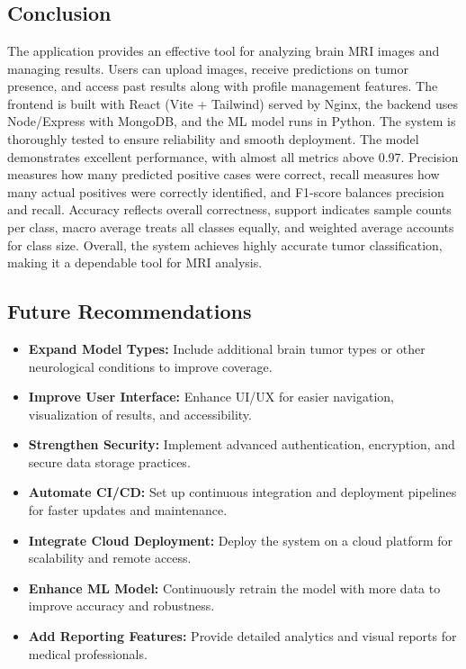 \section*{\Large{}}

\subsection{Conclusion}
The application provides an effective tool for analyzing brain MRI images and managing results. Users can upload images, receive predictions on tumor presence, and access past results along with profile management features. The frontend is built with React (Vite + Tailwind) served by Nginx, the backend uses Node/Express with MongoDB, and the ML model runs in Python. The system is thoroughly tested to ensure reliability and smooth deployment. The model demonstrates excellent performance, with almost all metrics above 0.97. Precision measures how many predicted positive cases were correct, recall measures how many actual positives were correctly identified, and F1-score balances precision and recall. Accuracy reflects overall correctness, support indicates sample counts per class, macro average treats all classes equally, and weighted average accounts for class size. Overall, the system achieves highly accurate tumor classification, making it a dependable tool for MRI analysis.
\subsection{Future Recommendations}
\begin{itemize}
    \item \textbf{Expand Model Types:} Include additional brain tumor types or other neurological conditions to improve coverage.
    \item \textbf{Improve User Interface:} Enhance UI/UX for easier navigation, visualization of results, and accessibility.
    \item \textbf{Strengthen Security:} Implement advanced authentication, encryption, and secure data storage practices.
    \item \textbf{Automate CI/CD:} Set up continuous integration and deployment pipelines for faster updates and maintenance.
    \item \textbf{Integrate Cloud Deployment:} Deploy the system on a cloud platform for scalability and remote access.
    \item \textbf{Enhance ML Model:} Continuously retrain the model with more data to improve accuracy and robustness.
    \item \textbf{Add Reporting Features:} Provide detailed analytics and visual reports for medical professionals.
\end{itemize}

